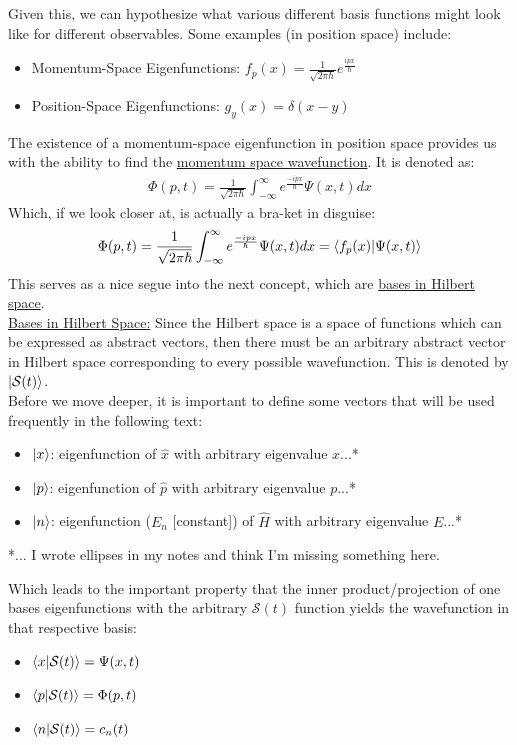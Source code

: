 \documentclass{article}
\newcommand{\gap}{\medskip\\}
\newcommand{\sheader}[1]{\underline{#1:}}
\begin{document}
    Given this, we can hypothesize what various different basis functions might 
    look like for different observables. Some examples (in position space) include:
    \begin{itemize}
        \item Momentum-Space Eigenfunctions: $f_p(x) = \frac{1}{\sqrt{2\pi \hbar}} e^\frac{ipx}{\hbar}$
        \item Position-Space Eigenfunctions: $g_y(x) = \delta(x-y)$
    \end{itemize}
    The existence of a momentum-space eigenfunction in position space provides us 
    with the ability to find the \underline{momentum space wavefunction}. It is 
    denoted as:
    \begin{align*}
        \Phi(p, t) = \frac{1}{\sqrt{2\pi \hbar}} \int_{-\infty}^\infty e^{\frac{-ipx}{\hbar}}\Psi(x,t)dx
    \end{align*}
    Which, if we look closer at, is actually a bra-ket in disguise:
    \begin{align*}
        \Phi(p, t) = \frac{1}{\sqrt{2\pi \hbar}} \int_{-\infty}^\infty e^{\frac{-ipx}{\hbar}}\Psi(x,t)dx
        = \braket{f_p(x)}{\Psi(x,t)}
    \end{align*}
    This serves as a nice segue into the next concept, which are \underline{bases in Hilbert space}.
    \gap
    \sheader{Bases in Hilbert Space} Since the Hilbert space is a space of functions which 
    can be expressed as abstract vectors, then there must be an arbitrary abstract vector in 
    Hilbert space corresponding to every possible wavefunction. This is denoted by 
    $\ket{\mathcal{S}(t)}$.
    \gap
    Before we move deeper, it is important to define some vectors that will be used 
    frequently in the following text:
    \begin{itemize}
        \item $\ket{x}$: eigenfunction of $\hat{x}$ with arbitrary eigenvalue $x$...*
        \item $\ket{p}$: eigenfunction of $\hat{p}$ with arbitrary eigenvalue $p$...*
        \item $\ket{n}$: eigenfunction ($E_n$ [constant]) of $\hat{H}$ with arbitrary eigenvalue $E$...*
    \end{itemize}
    *... I wrote ellipses in my notes and think I'm missing something here.

    \pagebreak

    Which leads to the important property that the inner product/projection of one 
    bases eigenfunctions with the arbitrary $\mathcal{S}(t)$ function yields the 
    wavefunction in that respective basis:
    \begin{itemize}
        \item $\braket{x}{\mathcal{S}(t)} = \Psi(x,t)$
        \item $\braket{p}{\mathcal{S}(t)} = \Phi(p,t)$
        \item $\braket{n}{\mathcal{S}(t)} = c_n(t)$
    \end{itemize}
\end{document}
